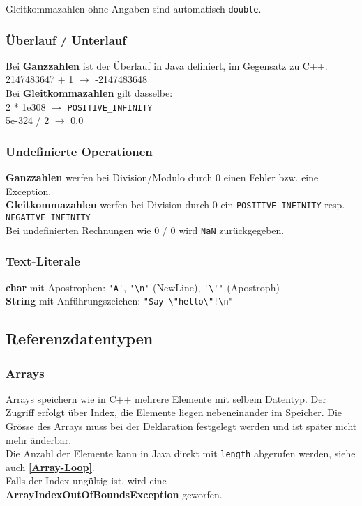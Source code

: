 Gleitkommazahlen ohne Angaben sind automatisch \verb|double|.

\subsubsection{Überlauf / Unterlauf}
Bei \textbf{Ganzzahlen} ist der Überlauf in Java definiert, im Gegensatz zu C++.\\
2147483647 + 1 $ \rightarrow $ -2147483648\\

Bei \textbf{Gleitkommazahlen} gilt dasselbe:\\
2 * 1e308 $ \rightarrow $ \verb|POSITIVE_INFINITY|\\
5e-324 / 2 $ \rightarrow $ 0.0

\subsubsection{Undefinierte Operationen}
\textbf{Ganzzahlen} werfen bei Division/Modulo durch 0 einen Fehler bzw. eine Exception.\\

\textbf{Gleitkommazahlen} werfen bei Division durch 0 ein \verb|POSITIVE_INFINITY| resp. \verb|NEGATIVE_INFINITY|\\
Bei undefinierten Rechnungen wie 0 / 0 wird \verb|NaN| zurückgegeben.

\subsubsection{Text-Literale}
\textbf{char} mit Apostrophen: \verb|'A'|, \verb|'\n'| (NewLine), \verb|'\''| (Apostroph) \\

\textbf{String} mit Anführungszeichen: \verb|"Say \"hello\"!\n"|

\subsection{Referenzdatentypen}

\subsubsection{Arrays}
Arrays speichern wie in C++ mehrere Elemente mit selbem Datentyp. Der Zugriff erfolgt über Index, die Elemente liegen nebeneinander im Speicher.
Die Grösse des Arrays muss bei der Deklaration festgelegt werden und ist später nicht mehr änderbar.\\
Die Anzahl der Elemente kann in Java direkt mit \verb|length| abgerufen werden, siehe auch \textbf{\ref{Array-Loop}}.\\
Falls der Index ungültig ist, wird eine\\
\textbf{ArrayIndexOutOfBoundsException} geworfen.

